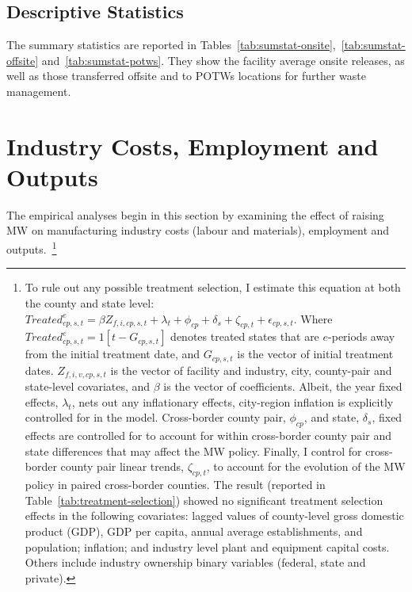 \documentclass[12pt, english]{article}
\begin{document}
    \subsection{Descriptive Statistics}\label{subsec:descriptive-statistics}
    The summary statistics are reported in Tables~\ref{tab:sumstat-onsite},~\ref{tab:sumstat-offsite} and~\ref{tab:sumstat-potws}. They show the facility average onsite releases, as well as those transferred offsite and to POTWs locations for further waste management.
    
    
    
%    


    \section{Industry Costs, Employment and Outputs}\label{sec:industry-costs-employment-and-outputs}
    The empirical analyses begin in this section by examining the effect of raising MW on manufacturing industry costs (labour and materials), employment and outputs.~\footnote{\tiny To rule out any possible treatment selection, I estimate this equation at both the county and state level: $Treated_{cp,s,t}^e = \beta Z_{f,i,cp,s,t} + \lambda_{t} + \phi_{cp} + \delta_{s} + \zeta_{cp,t} + \epsilon_{cp,s,t}$. Where $Treated_{cp,s,t}^e = 1[t - G_{cp,s,t}]$ denotes treated states that are $e$-periods away from the initial treatment date, and $G_{cp,s,t}$ is the vector of initial treatment dates. $Z_{f,i,v,cp,s,t}$ is the vector of facility and industry, city, county-pair and state-level covariates, and $\beta$ is the vector of coefficients. Albeit, the year fixed effects, $\lambda_{t}$, nets out any inflationary effects, city-region inflation is explicitly controlled for in the model. Cross-border county pair, $\phi_{cp}$, and state, $\delta_{s}$, fixed effects are controlled for to account for within cross-border county pair and state differences that may affect the MW policy. Finally, I control for cross-border county pair linear trends, $\zeta_{cp,t}$, to account for the evolution of the MW policy in paired cross-border counties. The result (reported in Table~\ref{tab:treatment-selection}) showed no significant treatment selection effects in the following covariates: lagged values of county-level gross domestic product (GDP), GDP per capita, annual average establishments, and population; inflation; and industry level plant and equipment capital costs. Others include industry ownership binary variables (federal, state and private).}
\end{document}

